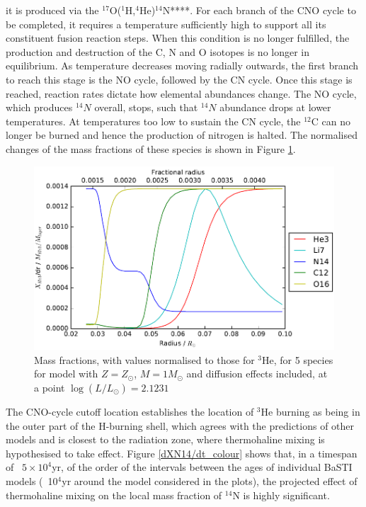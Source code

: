 \documentclass[12pt, a4paper]{report}
\begin{document}
it is produced via the $^{17}$O($^{1}$H,$^{4}$He)$^{14}$N****. For each branch of the CNO cycle to be completed, it requires a temperature sufficiently high to support all its constituent fusion reaction steps. When this condition is no longer fulfilled, the production and destruction of the C, N and O isotopes is no longer in equilibrium. As temperature decreases moving radially outwards, the first branch to reach this stage is the NO cycle, followed by the CN cycle. Once this stage is reached, reaction rates dictate how elemental abundances change. The NO cycle, which produces $^{14}N$ overall, stops, such that $^{14}N$ abundance drops at lower temperatures. At temperatures too low to sustain the CN cycle, the $^{12}$C can no longer be burned and hence the production of nitrogen is halted. The normalised changes of the mass fractions of these species is shown in Figure \ref{5specs_norm}.

\begin{figure}
\begin{center}
\includegraphics[scale=0.8]{../mu_test_data/mu_test_graphs/burning_logL=2p1231_5species.png}
\caption{Mass fractions, with values normalised to those for $^{3}$He, for 5 species for model with $Z = Z_{\odot}$, $M = 1M_{\odot}$ and diffusion effects included, at a point $\log(L/L_{\odot}) = 2.1231$}
\label{5specs_norm}
\end{center}
\end{figure}

The CNO-cycle cutoff location establishes the location of $^{3}$He burning as being in the outer part of the H-burning shell, which agrees with the predictions of other models and is closest to the radiation zone, where thermohaline mixing is hypothesised to take effect. Figure \ref{dXN14/dt_colour} shows that, in a timespan of ~$5 \times 10^{4}$yr, of the order of the intervals between the ages of individual BaSTI models (~10$^{4}$yr around the model considered in the plots), the projected effect of thermohaline mixing on the local mass fraction of $^{14}$N is highly significant.
\end{document}
